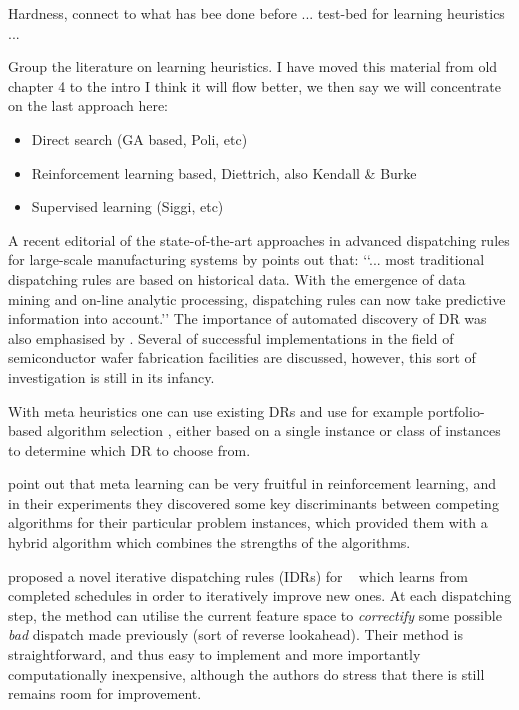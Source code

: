 \documentclass[smallextended]{svjour3}
\begin{document}
Hardness, connect to what has bee done before ... test-bed for learning heuristics ...

Group the literature on learning heuristics. I have moved this material from old chapter 4 to the intro I think it will flow better, we then say we will concentrate on the last approach here:
\begin{itemize}
\item Direct search (GA based, Poli, etc)
\item Reinforcement learning based, Diettrich, also Kendall \& Burke
\item Supervised learning (Siggi, etc)
\end{itemize}


A recent editorial of the state-of-the-art approaches in advanced dispatching 
rules for large-scale manufacturing systems by \cite{Chen13} points out that:
\lq\lq ... most traditional dispatching rules are based on historical data. 
With the emergence of data mining and on-line analytic processing, dispatching 
rules can now take predictive information into account.\rq\rq 
The importance of automated discovery of DR was also emphasised by 
\cite{Monch13}. 
Several of successful implementations in the field of semiconductor wafer 
fabrication facilities are discussed, however, this sort of investigation is 
still in its infancy.


With meta heuristics one can use existing DRs and use for example 
portfolio-based algorithm selection \cite{Rice76,Gomes01}, either based on a 
single instance or class of instances \cite{Xu07} to determine which DR to 
choose from. 

\cite{Kalyanakrishnan11} point out that meta learning can be very fruitful in 
reinforcement learning, and in their experiments they discovered some key 
discriminants between competing algorithms for their particular problem 
instances, which provided them with a hybrid algorithm which combines the 
strengths of the algorithms.

\cite{Nguyen13} proposed a novel iterative dispatching rules (IDRs) for \JSP~
which learns from completed schedules in order to iteratively improve new ones. 
At each dispatching step, the method can utilise the current feature space to 
\emph{correctify} some possible \emph{bad} dispatch made previously (sort of 
reverse lookahead).  Their method is straightforward, and thus easy to 
implement and more importantly computationally inexpensive, although the 
authors do stress that there is still remains room for improvement.
\end{document}

